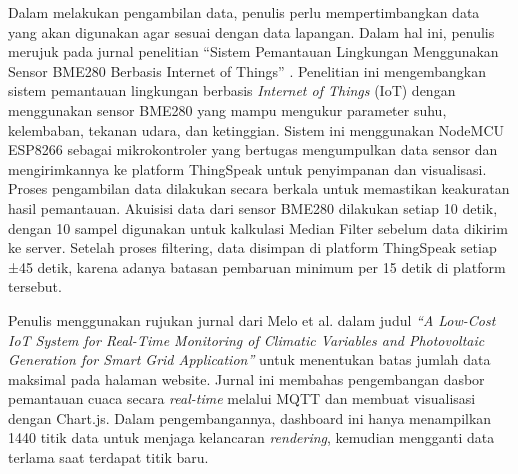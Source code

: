 Dalam melakukan pengambilan data, penulis perlu mempertimbangkan data yang akan digunakan agar sesuai dengan data lapangan. Dalam hal ini, penulis merujuk pada jurnal penelitian “Sistem Pemantauan Lingkungan Menggunakan Sensor BME280 Berbasis Internet of Things” \cite{Triawan2023}. Penelitian ini mengembangkan sistem pemantauan lingkungan berbasis \textit{Internet of Things} (IoT) dengan menggunakan sensor BME280 yang mampu mengukur parameter suhu, kelembaban, tekanan udara, dan ketinggian. Sistem ini menggunakan NodeMCU ESP8266 sebagai mikrokontroler yang bertugas mengumpulkan data sensor dan mengirimkannya ke platform ThingSpeak untuk penyimpanan dan visualisasi. Proses pengambilan data dilakukan secara berkala untuk memastikan keakuratan hasil pemantauan. Akuisisi data dari sensor BME280 dilakukan setiap 10 detik, dengan 10 sampel digunakan untuk kalkulasi Median Filter sebelum data dikirim ke server. Setelah proses filtering, data disimpan di platform ThingSpeak setiap ±45 detik, karena adanya batasan pembaruan minimum per 15 detik di platform tersebut. 

Penulis menggunakan rujukan jurnal dari Melo et al. dalam judul \textit{“A Low-Cost IoT System for Real-Time Monitoring of Climatic Variables and Photovoltaic Generation for Smart Grid Application”} \cite{Melo2021} untuk menentukan batas jumlah data maksimal pada halaman website. Jurnal ini membahas pengembangan dasbor pemantauan cuaca secara \textit{real-time} melalui MQTT dan membuat visualisasi dengan Chart.js. Dalam pengembangannya, dashboard ini hanya menampilkan 1440 titik data untuk menjaga kelancaran \textit{rendering}, kemudian mengganti data terlama saat terdapat titik baru. 

